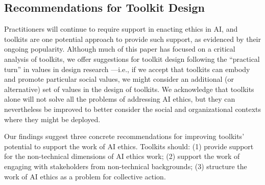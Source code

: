 \documentclass[acmsmall]{acmart}
\begin{document}
\subsection{Recommendations for Toolkit Design}
\label{section:recommendations-design}
Practitioners will continue to require support in enacting ethics in AI, and toolkits are one potential approach to provide such support, as evidenced by their ongoing popularity. Although much of this paper has focused on a critical analysis of toolkits, we offer suggestions for toolkit design following the ``practical turn'' in values in design research \cite[pg9]{flanagan2014values}---i.e., if we accept that toolkits can embody and promote particular social values, we might consider an additional (or alternative) set of values in the design of toolkits. We acknowledge that toolkits alone will not solve all the problems of addressing AI ethics, but they can nevertheless be improved to better consider the social and organizational contexts where they might be deployed. 

Our findings suggest three concrete recommendations for improving toolkits' potential to support the work of AI ethics. Toolkits should: (1) provide support for the non-technical dimensions of AI ethics work; (2) support the work of engaging with stakeholders from non-technical backgrounds; (3) structure the work of AI ethics as a problem for collective action. %


\end{document}
